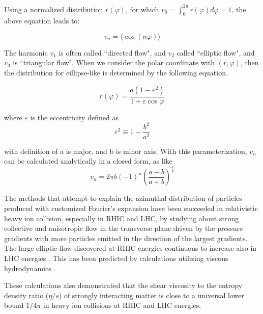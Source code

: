 Using a normalized distribution $r( \varphi )$, for which $v_0 = \int_{0}^{2\pi}{r ( \varphi )} d\varphi = 1$, the above equation leads to:
	
\begin{equation}
	v_n = \langle \cos(n\varphi) \rangle 	
\end{equation}
\smallskip


	The harmonic $v_1$ is often called ``directed flow", and $v_2$ called ``elliptic flow", and $v_3$ is ``triangular flow". When we consider the polar coordinate with $(r, \varphi)$, then the distribution for eillipse-like is determined by the following equation. 
	

\begin{equation}
	r(\varphi) = \frac{a(1-\varepsilon^2)}{1+\varepsilon \cos \varphi}
\end{equation}
\smallskip

	where $\varepsilon$ is the eccentricity defined as 
\begin{equation}
	\varepsilon^2 \equiv 1 - \frac{b^2}{a^2}
\end{equation}

	with definition of a is major, and b is minor axis. With this parameterization, $v_n$ can be calculated analytically in a closed form, as like
\begin{equation}
	v_n = 2\pi b(-1)^{n}(\frac{a-b}{a+b})^{\frac{n}{2}}
\end{equation}

	The methods that attempt to explain the azimuthal distribution of particles produced with customized Fourier's expansion have been succeeded in relativistic heavy ion collision, especially in RHIC and LHC, by studying about strong collective and anisotropic flow in the transverse plane driven by the pressure gradients with more particles emitted in the direction of the largest gradients. The large elliptic flow discovered at RHIC energies \cite{Ackermann:2000tr} continuous to increase also in LHC energies \cite{Aamodt:2010pa,Adam:2016izf}. This has been predicted by calculations utilizing viscous hydrodynamics \cite{Romatschke:2007mq,Shen:2011eg,Schenke:2011zz,Bozek:2012qs,Gale:2012rq,Hirano:2010je}.

These calculations also demonstrated that the shear viscosity to the entropy density ratio ($\eta/s$) of strongly interacting matter is close to a universal lower bound $1/4\pi$ \cite{Kovtun:2004de} in heavy ion collisions at RHIC and LHC energies.

